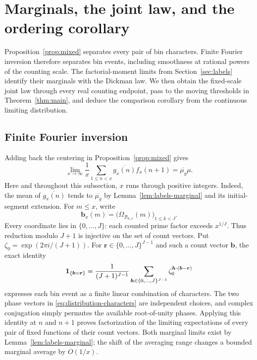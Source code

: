 \section{Marginals, the joint law, and the ordering corollary}
\label{sec:distribution}

Proposition~\ref{prop:mixed} separates every pair of bin characters.
Finite Fourier inversion therefore separates bin events, including
smoothness at rational powers of the counting scale.  The factorial-moment
limits from Section~\ref{sec:labels} identify their marginals with the
Dickman law.  We then obtain the fixed-scale joint law through every real
counting endpoint, pass to the moving thresholds in Theorem~\ref{thm:main},
and deduce the comparison corollary from the continuous limiting distribution.

\subsection{Finite Fourier inversion}

Adding back the centering in Proposition~\ref{prop:mixed} gives
\begin{equation}
 \lim_{x\to\infty}\frac1x\sum_{1\le n<x}
       \overline{g_x(n)}f_x(n+1)=\overline{\mu_g}\mu.
 \label{eq:distribution-characters}
\end{equation}
Here and throughout this subsection, $x$ runs through positive integers.
Indeed, the mean of $\overline{g_x(n)}$ tends to
$\overline{\mu_g}$ by Lemma~\ref{lem:labels-marginal} and its
initial-segment extension.
For $m\le x$, write
\[
 \boldsymbol b_x(m)
   =\bigl(\Omega_{\mathcal B_{k,x}}(m)\bigr)_{1\le k<J}.
\]
Every coordinate lies in $\{0,\ldots,J\}$: each counted prime
factor exceeds $x^{1/J}$.  Thus reduction modulo $J+1$ is injective
on the set of count vectors.  Put
$\zeta_0=\exp(2\pi i/(J+1))$.  For
$\boldsymbol r\in\{0,\ldots,J\}^{J-1}$ and such a count vector
$\boldsymbol b$, the exact identity
\[
 \mathbf 1_{\{\boldsymbol b=\boldsymbol r\}}
  =\frac1{(J+1)^{J-1}}
    \sum_{\boldsymbol h\in\{0,\ldots,J\}^{J-1}}
       \zeta_0^{\boldsymbol h\cdot(\boldsymbol b-\boldsymbol r)}
\]
expresses each bin event as a finite linear combination of characters.
The two phase vectors in \eqref{eq:distribution-characters} are
independent choices, and complex conjugation simply permutes the
available root-of-unity phases.  Applying this identity at $n$ and
$n+1$ proves factorization of the limiting expectations of every
pair of fixed functions of their count vectors.  Both marginal limits
exist by Lemma~\ref{lem:labels-marginal}; the shift of the averaging
range changes a bounded marginal average by $O(1/x)$.

